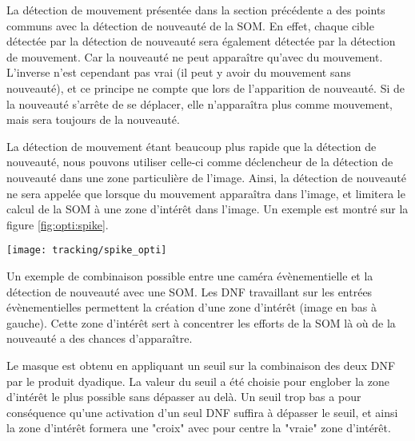 	La détection de mouvement présentée dans la section précédente a des points communs avec la détection de nouveauté de la SOM. En effet, chaque cible détectée par la détection de nouveauté sera également détectée par la détection de mouvement. Car la nouveauté ne peut apparaître qu'avec du mouvement. L'inverse n'est cependant pas vrai (il peut y avoir du mouvement sans nouveauté), et ce principe ne compte que lors de l'apparition de nouveauté. Si de la nouveauté s'arrête de se déplacer, elle n'apparaîtra plus comme mouvement, mais sera toujours de la nouveauté.

	La détection de mouvement étant beaucoup plus rapide que la détection de nouveauté, nous pouvons utiliser celle-ci comme déclencheur de la détection de nouveauté dans une zone particulière de l'image. Ainsi, la détection de nouveauté ne sera appelée que lorsque du mouvement apparaîtra dans l'image, et limitera le calcul de la SOM à une zone d'intérêt dans l'image. Un exemple est montré sur la figure \ref{fig:opti:spike}.

	\begin{figureth}
		\begin{subfigureth}{\textwidth}
			\texttt{[image: tracking/spike\_opti]}
		\end{subfigureth}
		\caption[Combinaison SOM et DNF par zone d'intérêt]{Un exemple de combinaison possible entre une caméra évènementielle et la détection de nouveauté avec une SOM. Les DNF travaillant sur les entrées évènementielles permettent la création d'une zone d'intérêt (image en bas à gauche). Cette zone d'intérêt sert à concentrer les efforts de la SOM là où de la nouveauté a des chances d'apparaître.}\label{fig:opti:spike}
	\end{figureth}

	Le masque est obtenu en appliquant un seuil sur la combinaison des deux DNF par le produit dyadique. La valeur du seuil a été choisie pour englober la zone d'intérêt le plus possible sans dépasser au delà. Un seuil trop bas a pour conséquence qu'une activation d'un seul DNF suffira à dépasser le seuil, et ainsi la zone d'intérêt formera une "croix" avec pour centre la "vraie" zone d'intérêt.

